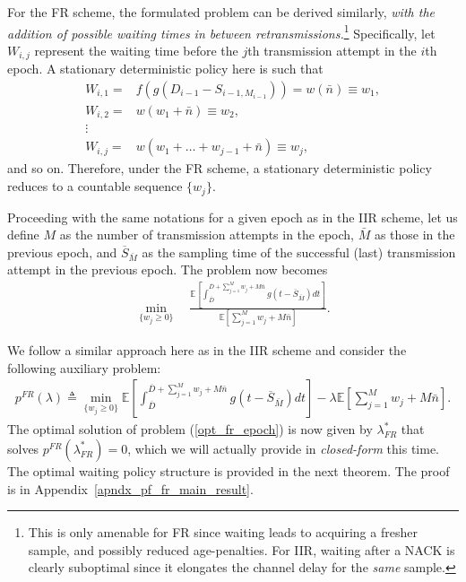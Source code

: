 \documentclass[12pt,journal,onecolumn]{IEEEtran}
\begin{document}
For the FR scheme, the formulated problem can be derived similarly, {\it with the addition of possible waiting times in between retransmissions.}\footnote{This is only amenable for FR since waiting leads to acquiring a fresher sample, and possibly reduced age-penalties. For IIR, waiting after a NACK is clearly suboptimal since it elongates the channel delay for the {\it same} sample.}
Specifically, let $W_{i,j}$ represent the waiting time before the $j$th transmission attempt in the $i$th epoch. A stationary deterministic policy here is such that
\begin{align}
W_{i,1}=&f\left(g\left(D_{i-1}-S_{i-1,M_{i-1}}\right)\right)=w\left(\bar{n}\right)\equiv w_1, \\
W_{i,2}=&w\left(w_1+\bar{n}\right)\equiv w_2, \\
\vdots& \nonumber \\
W_{i,j}=&w\left(w_1+\dots+w_{j-1}+\bar{n}\right)\equiv w_j,
\end{align}
and so on. Therefore, under the FR scheme, a stationary deterministic policy reduces to a countable sequence $\{w_j\}$.

Proceeding with the same notations for a given epoch as in the IIR scheme, let us define $M$ as the number of transmission attempts in the epoch, $\bar{M}$ as those in the previous epoch, and $\overline{S}_{\bar{M}}$ as the sampling time of the successful (last) transmission attempt in the previous epoch. The problem now becomes
\begin{align} \label{opt_fr_epoch}
\min_{\{w_j\geq0\}} \quad \frac{\mathbb{E}\left[\int_{\overline{D}}^{\overline{D}+\sum_{j=1}^Mw_j+M\bar{n}}g\left(t-\overline{S}_{\bar{M}}\right)dt\right]}{\mathbb{E}\left[\sum_{j=1}^Mw_j+M\bar{n}\right]}.
\end{align}

We follow a similar approach here as in the IIR scheme and consider the following auxiliary problem:
\begin{align} \label{opt_fr_aux}
p^{FR}(\lambda)\!\triangleq\!\min_{\{w_j\geq0\}} \mathbb{E}\left[\int_{\overline{D}}^{\overline{D}+\sum_{j=1}^Mw_j+M\bar{n}}g\left(t-\overline{S}_{\bar{M}}\right)dt\right]-\lambda\mathbb{E}\left[\sum_{j=1}^Mw_j+M\bar{n}\right].
\end{align}
The optimal solution of problem (\ref{opt_fr_epoch}) is now given by $\lambda^*_{FR}$ that solves $p^{FR}\left(\lambda^*_{FR}\right)=0$, which we will actually provide in {\it closed-form} this time. The optimal waiting policy structure is provided in the next theorem. The proof is in Appendix~\ref{apndx_pf_fr_main_result}. 
\end{document}
